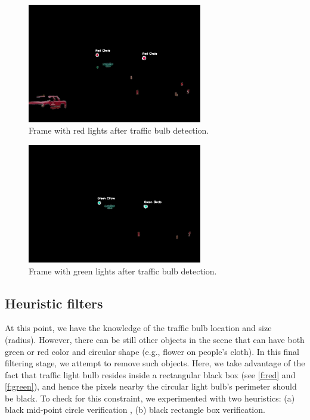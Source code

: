 \begin{figure}[!ht]
  \centering
  \includegraphics[width=3in]{images/Detectedredcircles.pdf}
  \caption{Frame with red lights after traffic bulb detection.}
  \label{f:red_cir}
\end{figure}

\begin{figure}[!ht]
  \centering
  \includegraphics[width=3in]{images/Detectedgreencircles.pdf}
  \caption{Frame with green lights after traffic bulb detection.}
  \label{f:green_cir}
\end{figure}



\subsection{Heuristic filters}
\label{s:filter}
At this point, we have the knowledge of the traffic bulb location and size (radius).
However, there can be still other objects in the scene that can have both green or red color and circular shape (e.g., flower on people's cloth).
In this final filtering stage, we attempt to remove such objects. 
Here, we take advantage of the fact that traffic light bulb resides inside a rectangular black box (see \ref{f:red} and \ref{f:green}), and hence the pixels nearby the circular light bulb's perimeter should be black.
To check for this constraint, we experimented with two heuristics: (a) black mid-point circle verification \cite{midpoint}, (b) black rectangle box verification.

